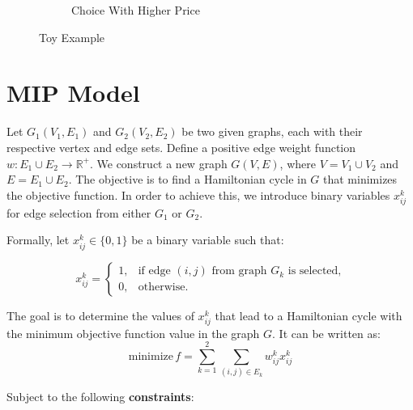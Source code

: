 \documentclass{article}
\begin{document}
\begin{figure}[!ht]
\begin{subfigure}{0.3\textwidth}
    \caption{Choice With Higher Price}%
    \label{fig:Higherprice}
  \end{subfigure}%
  \caption{Toy Example}
\end{figure}
\section{MIP Model}
Let $G_1(V_1, E_1)$ and $G_2(V_2, E_2)$ be two given graphs, each with their
respective vertex and edge sets. Define a positive edge weight function $w :
  E_1 \cup E_2 \rightarrow \mathbb{R}^+$. We construct a new graph $G(V, E)$,
where $V = V_1 \cup V_2$ and $E = E_1 \cup E_2$. The objective is to find a
Hamiltonian cycle in $G$ that minimizes the objective function. In order to
achieve this, we introduce binary variables $x_{ij}^k$ for edge selection from
either $G_1$ or $G_2$.

Formally, let $x_{ij}^k \in \{0, 1\}$ be a binary variable such that:

\begin{equation*}
  x_{ij}^k =
  \begin{cases}
    1, & \text{if edge } (i, j) \text{ from graph } G_k \text{ is selected,} \\
    0, & \text{otherwise.}
  \end{cases}
\end{equation*}

The goal is to determine the values of $x_{ij}^k$ that lead to a Hamiltonian
cycle with the minimum objective function value in the graph $G$. It can be
written as:
\begin{equation*}
  \text{minimize} \, f = \sum_{k=1}^{2} \sum_{(i,j) \in E_k} w_{ij}^k x_{ij}^k
\end{equation*}

Subject to the following \textbf{constraints}:
\end{document}
